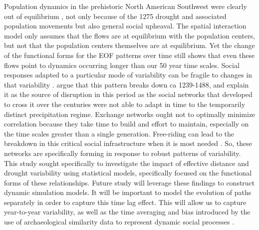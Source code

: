 \documentclass[10pt]{iopart}
\begin{document}
Population dynamics in the prehistoric North American Southwest were clearly out of equilibrium \parencite{Hill2004}, not only because of the 1275 drought and associated population movements but also general social upheaval. The spatial interaction model only assumes that the flows are at equilibrium with the population centers, but not that the population centers themselves are at equilibrium. Yet the change of the functional forms for the EOF patterns over time still shows that even these flows point to dynamics occurring longer than our 50 year time scales. Social responses adapted to a particular mode of variability can be fragile to changes in that variability \parencite{Janssen2007}. \textcite{Cordell2007} argue that this pattern breaks down ca 1239-1488, and explain it as the source of disruption in this period as the social networks that developed to cross it over the centuries were not able to adapt in time to the temporarily distinct precipitation regime. Exchange networks ought not to optimally minimize correlation because they take time to build and effort to maintain, especially on the time scales greater than a single generation. Free-riding can lead to the breakdown in this critical social infrastructure when it is most needed \parencite{Kohler1996}. So, these networks are specifically forming in response to robust patterns of variability. This study sought specifically to investigate the impact of effective distance and drought variability using statistical models, specifically focused on the functional forms of these relationships. Future study will leverage these findings to construct dynamic simulation models. It will be important to model the evolution of paths separately \parencite{Bevan2013} in order to capture this time lag effect. This will allow us to capture year-to-year variability, as well as the time averaging and bias introduced by the use of archaeological similarity data to represent dynamic social processes \parencite{Crema2014}.

\end{document}

